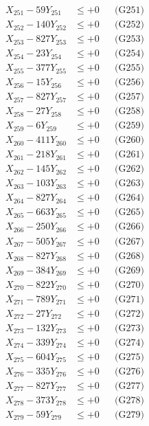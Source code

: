 \documentclass[a4paper,10pt]{article}
\begin{document}
{\begin{align}
\allowbreak
X_{251} - 59Y_{251} &\leq +0 && \text{(G251)} \\
X_{252} - 140Y_{252} &\leq +0 && \text{(G252)} \\
X_{253} - 827Y_{253} &\leq +0 && \text{(G253)} \\
X_{254} - 23Y_{254} &\leq +0 && \text{(G254)} \\
X_{255} - 377Y_{255} &\leq +0 && \text{(G255)} \\
X_{256} - 15Y_{256} &\leq +0 && \text{(G256)} \\
X_{257} - 827Y_{257} &\leq +0 && \text{(G257)} \\
X_{258} - 27Y_{258} &\leq +0 && \text{(G258)} \\
X_{259} - 6Y_{259} &\leq +0 && \text{(G259)} \\
X_{260} - 411Y_{260} &\leq +0 && \text{(G260)} \\
\allowbreak
X_{261} - 218Y_{261} &\leq +0 && \text{(G261)} \\
X_{262} - 145Y_{262} &\leq +0 && \text{(G262)} \\
X_{263} - 103Y_{263} &\leq +0 && \text{(G263)} \\
X_{264} - 827Y_{264} &\leq +0 && \text{(G264)} \\
X_{265} - 663Y_{265} &\leq +0 && \text{(G265)} \\
X_{266} - 250Y_{266} &\leq +0 && \text{(G266)} \\
X_{267} - 505Y_{267} &\leq +0 && \text{(G267)} \\
X_{268} - 827Y_{268} &\leq +0 && \text{(G268)} \\
X_{269} - 384Y_{269} &\leq +0 && \text{(G269)} \\
X_{270} - 822Y_{270} &\leq +0 && \text{(G270)} \\
\allowbreak
X_{271} - 789Y_{271} &\leq +0 && \text{(G271)} \\
X_{272} - 27Y_{272} &\leq +0 && \text{(G272)} \\
X_{273} - 132Y_{273} &\leq +0 && \text{(G273)} \\
X_{274} - 339Y_{274} &\leq +0 && \text{(G274)} \\
X_{275} - 604Y_{275} &\leq +0 && \text{(G275)} \\
X_{276} - 335Y_{276} &\leq +0 && \text{(G276)} \\
X_{277} - 827Y_{277} &\leq +0 && \text{(G277)} \\
X_{278} - 373Y_{278} &\leq +0 && \text{(G278)} \\
X_{279} - 59Y_{279} &\leq +0 && \text{(G279)} \\

\end{align}}
\end{document}
